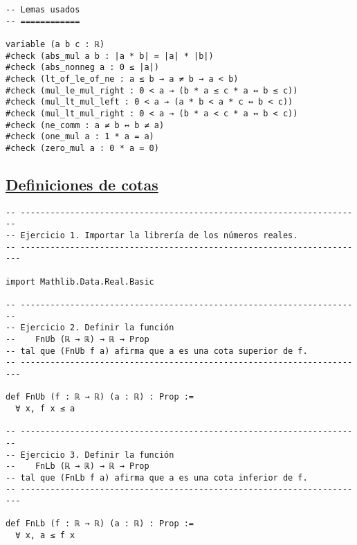 \begin{verbatim}
-- Lemas usados
-- ============

variable (a b c : ℝ)
#check (abs_mul a b : |a * b| = |a| * |b|)
#check (abs_nonneg a : 0 ≤ |a|)
#check (lt_of_le_of_ne : a ≤ b → a ≠ b → a < b)
#check (mul_le_mul_right : 0 < a → (b * a ≤ c * a ↔ b ≤ c))
#check (mul_lt_mul_left : 0 < a → (a * b < a * c ↔ b < c))
#check (mul_lt_mul_right : 0 < a → (b * a < c * a ↔ b < c))
#check (ne_comm : a ≠ b ↔ b ≠ a)
#check (one_mul a : 1 * a = a)
#check (zero_mul a : 0 * a = 0)
\end{verbatim}

\subsection{\href{./src/Logica/Definiciones\_de\_cotas.lean}{Definiciones de cotas}}
\label{sec:org43c51e9}
\begin{verbatim}
-- ---------------------------------------------------------------------
-- Ejercicio 1. Importar la librería de los números reales.
-- ----------------------------------------------------------------------

import Mathlib.Data.Real.Basic

-- ---------------------------------------------------------------------
-- Ejercicio 2. Definir la función
--    FnUb (ℝ → ℝ) → ℝ → Prop
-- tal que (FnUb f a) afirma que a es una cota superior de f.
-- ----------------------------------------------------------------------

def FnUb (f : ℝ → ℝ) (a : ℝ) : Prop :=
  ∀ x, f x ≤ a

-- ---------------------------------------------------------------------
-- Ejercicio 3. Definir la función
--    FnLb (ℝ → ℝ) → ℝ → Prop
-- tal que (FnLb f a) afirma que a es una cota inferior de f.
-- ----------------------------------------------------------------------

def FnLb (f : ℝ → ℝ) (a : ℝ) : Prop :=
  ∀ x, a ≤ f x
\end{verbatim}

